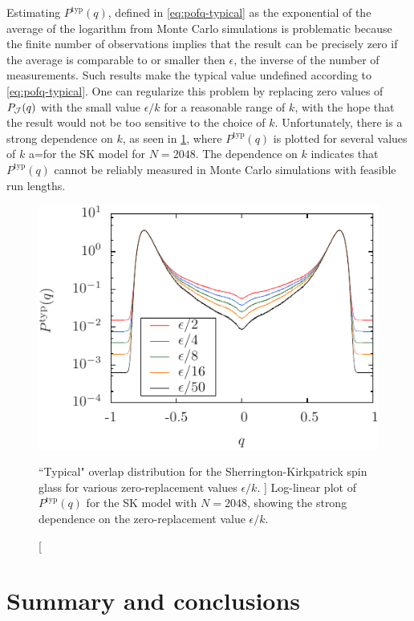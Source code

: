 Estimating $P^{\mathrm{typ}}(q)$, defined in \cref{eq:pofq-typical} as the
exponential of the average of the logarithm from Monte Carlo simulations is
problematic because the finite number of observations implies that the result
can be precisely zero if the average is comparable to or smaller then
$\epsilon$, the inverse of the number of measurements. Such results make the
typical value undefined according to \cref{eq:pofq-typical}. One can regularize
this problem by replacing zero values of $P_{\mathcal{J}}(q)$ with the small value
$\epsilon/k$ for a reasonable range of $k$, with the hope that the result would
not be too sensitive to the choice of $k$. Unfortunately, there is a strong
dependence on $k$, as seen in \cref{fig:pofq-typical-sk}, where
$P^{\mathrm{typ}}(q)$ is plotted for several values of $k$ a=for the SK model
for $N=2048$. The dependence on $k$ indicates that $P^{\mathrm{typ}}(q)$ cannot
be reliably measured in Monte Carlo simulations with feasible run lengths.

\begin{figure}
  \centering
  \includegraphics{import/EP}
  \caption
  [
    ``Typical" overlap distribution for the Sherrington-Kirkpatrick spin glass
    for various zero-replacement values $\epsilon/k$.
  ]
  {
    Log-linear plot of $P^{\mathrm{typ}}(q)$ for the SK model with $N=2048$,
    showing the strong dependence on the zero-replacement value $\epsilon/k$.
  }
  \label{fig:pofq-typical-sk}
\end{figure}


\section{Summary and conclusions}

